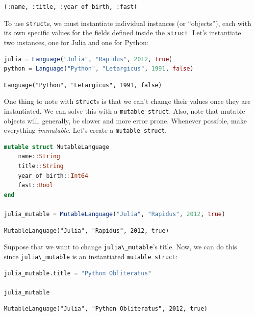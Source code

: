 \documentclass[
  notoc %
]{tufte-book}
\newcommand{\passthrough}[1]{#1}
\begin{document}
\begin{lstlisting}[language=Output]
(:name, :title, :year_of_birth, :fast)
\end{lstlisting}

To use \passthrough{\lstinline!struct!}s, we must instantiate individual
instances (or ``objects''), each with its own specific values for the
fields defined inside the \passthrough{\lstinline!struct!}. Let's
instantiate two instances, one for Julia and one for Python:

\begin{lstlisting}[language=Julia]
julia = Language("Julia", "Rapidus", 2012, true)
python = Language("Python", "Letargicus", 1991, false)
\end{lstlisting}

\begin{lstlisting}[language=Output]
Language("Python", "Letargicus", 1991, false)
\end{lstlisting}

One thing to note with \passthrough{\lstinline!struct!}s is that we
can't change their values once they are instantiated. We can solve this
with a \passthrough{\lstinline!mutable struct!}. Also, note that mutable
objects will, generally, be slower and more error prone. Whenever
possible, make everything \emph{immutable}. Let's create a
\passthrough{\lstinline!mutable struct!}.

\begin{lstlisting}[language=Julia]
mutable struct MutableLanguage
    name::String
    title::String
    year_of_birth::Int64
    fast::Bool
end

julia_mutable = MutableLanguage("Julia", "Rapidus", 2012, true)
\end{lstlisting}

\begin{lstlisting}[language=Output]
MutableLanguage("Julia", "Rapidus", 2012, true)
\end{lstlisting}

Suppose that we want to change
\passthrough{\lstinline!julia\_mutable!}'s title. Now, we can do this
since \passthrough{\lstinline!julia\_mutable!} is an instantiated
\passthrough{\lstinline!mutable struct!}:

\begin{lstlisting}[language=Julia]
julia_mutable.title = "Python Obliteratus"

julia_mutable
\end{lstlisting}

\begin{lstlisting}[language=Output]
MutableLanguage("Julia", "Python Obliteratus", 2012, true)
\end{lstlisting}
\end{document}
